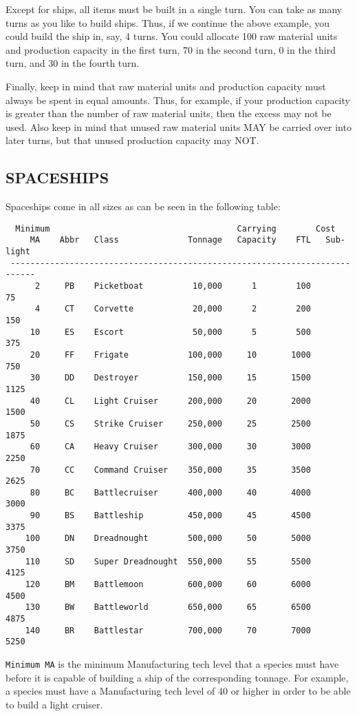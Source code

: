 \documentclass[10pt,titlepage]{article}
\begin{document}
Except for ships, all items must be built in a single turn.  You can take as
many turns as you like to build ships.  Thus, if we continue the above example,
you could build the ship in, say, 4 turns.  You could allocate 100 raw material
units and production capacity in the first turn, 70 in the second turn, 0 in
the third turn, and 30 in the fourth turn.

Finally, keep in mind that raw material units and production capacity must
always be spent in equal amounts.  Thus, for example, if your production
capacity is greater than the number of raw material units, then the excess may
not be used.  Also keep in mind that unused raw material units MAY be carried
over into later turns, but that unused production capacity may NOT.


\subsection{SPACESHIPS}
\label{sec:spaceships}


Spaceships come in all sizes as can be seen in the following table:
\begin{verbatim}
  Minimum                                      Carrying        Cost
     MA    Abbr   Class              Tonnage   Capacity    FTL   Sub-light
 ---------------------------------------------------------------------------
      2     PB    Picketboat          10,000      1        100       75
      4     CT    Corvette            20,000      2        200      150
     10     ES    Escort              50,000      5        500      375
     20     FF    Frigate            100,000     10       1000      750
     30     DD    Destroyer          150,000     15       1500     1125
     40     CL    Light Cruiser      200,000     20       2000     1500
     50     CS    Strike Cruiser     250,000     25       2500     1875
     60     CA    Heavy Cruiser      300,000     30       3000     2250
     70     CC    Command Cruiser    350,000     35       3500     2625
     80     BC    Battlecruiser      400,000     40       4000     3000
     90     BS    Battleship         450,000     45       4500     3375
    100     DN    Dreadnought        500,000     50       5000     3750
    110     SD    Super Dreadnought  550,000     55       5500     4125
    120     BM    Battlemoon         600,000     60       6000     4500
    130     BW    Battleworld        650,000     65       6500     4875
    140     BR    Battlestar         700,000     70       7000     5250
\end{verbatim}
\texttt{Minimum MA} is the minimum Manufacturing tech level that a species must have
before it is capable of building a ship of the corresponding tonnage.  For
example, a species must have a Manufacturing tech level of 40 or higher in
order to be able to build a light cruiser.
\end{document}
